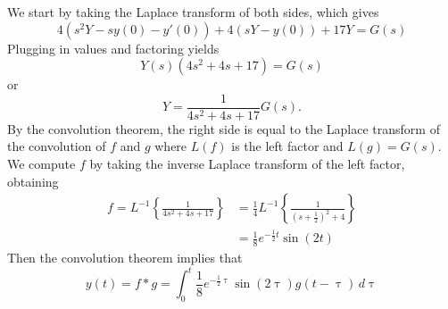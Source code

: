 \documentclass[11pt, titlepage]{article}
\begin{document}
\begin{enumerate}
            \begin{solution}
                We start by taking the Laplace transform of both sides, which
                gives
                \[
                    4(s^2Y - sy(0) - y'(0)) + 4(sY - y(0)) + 17Y = G(s)
                \] 
                Plugging in values and factoring yields
                \[
                    Y(s) (4s^2 + 4s + 17) = G(s)
                \] 
                or
                \[
                    Y = \frac{1}{4s^2 + 4s + 17} G(s).
                \] 
                By the convolution theorem, the right side is equal to the
                Laplace transform of the convolution of $f$ and $g$ where
                $L(f)$ is the left factor and $L(g) = G(s)$.
                We compute $f$ by taking the inverse Laplace transform of the
                left factor, obtaining
                \begin{align*}
                    f = L^{-1} \left\{ \frac{1}{4s^2 + 4s + 17} \right\} &=
                    \frac{1}{4} L^{-1} \left\{ \frac{1}{(s+\frac{1}{2})^2 + 4}
                        \right\} \\
                      &= \frac{1}{8} e^{-\frac{1}{2}t} \sin(2t)
                \end{align*}
                Then the convolution theorem implies that
                \[
                    y(t) = f * g = \int_{0}^{t} \frac{1}{8} e^{-\frac{1}{2}
                    \uptau} \sin(2 \uptau) g(t - \uptau) \, d\uptau
                \] 
            \end{solution}
    \end{enumerate}
\end{document}
